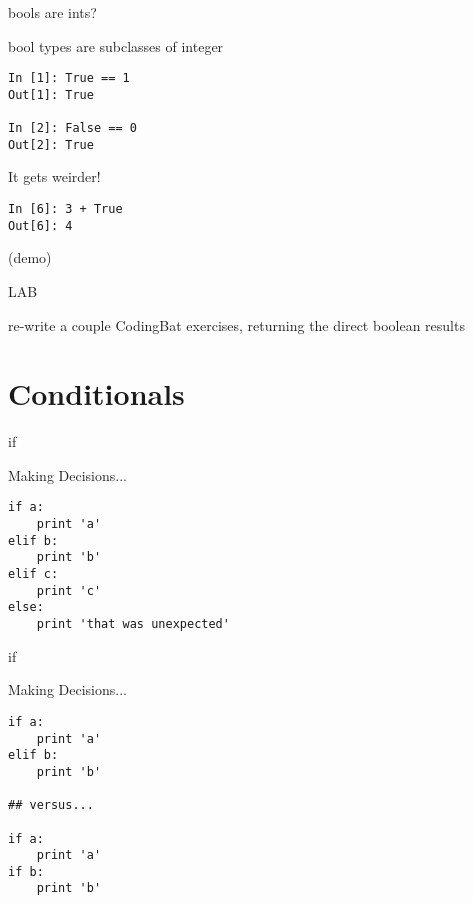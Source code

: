 \documentclass{beamer}
\begin{document}
\begin{frame}[fragile]{bools are ints?}

{\Large bool types are subclasses of integer}

\begin{verbatim}
In [1]: True == 1
Out[1]: True

In [2]: False == 0
Out[2]: True  
\end{verbatim}

{\Large It gets weirder! }

\begin{verbatim}
In [6]: 3 + True
Out[6]: 4
\end{verbatim}

(demo)

\end{frame}


\begin{frame}{LAB}

\vfill
{\large re-write a couple CodingBat exercises, returning the direct boolean results}
\vfill

\end{frame}

\section{Conditionals}

\begin{frame}[fragile]{if}

{\Large Making Decisions...}
\begin{verbatim}
if a:
    print 'a'
elif b:
    print 'b'
elif c:
    print 'c'
else:
    print 'that was unexpected'
\end{verbatim}

\end{frame}


\begin{frame}[fragile]{if}

{\Large Making Decisions...}
\begin{verbatim}
if a:
    print 'a'
elif b:
    print 'b'

## versus...

if a:
    print 'a'
if b:
    print 'b'
\end{verbatim}

\end{frame}
\end{document}

